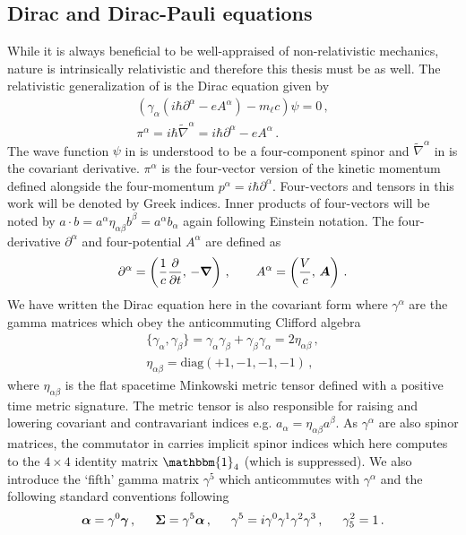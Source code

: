 \subsection{Dirac and Dirac-Pauli equations}
\label{sec:dp}
\noindent While it is always beneficial to be well-appraised of non-relativistic mechanics, nature is intrinsically relativistic and therefore this thesis must be as well. The relativistic generalization of  is the Dirac equation given by
\begin{gather}
    \label{dirac:1a}
    \left(\gamma_{\alpha}\left(i\hbar\partial^{\alpha} - eA^{\alpha}\right)-m_{\ell}c\right)\psi=0\,,\\
    \label{dirac:1b}
    \pi^{\alpha}=i\hbar{\widetilde\nabla}^{\alpha}=i\hbar\partial^{\alpha}-eA^{\alpha}\,.
\end{gather}
The wave function $\psi$ in  is understood to be a four-component spinor and $\widetilde\nabla^{\alpha}$ in  is the covariant derivative. $\pi^{\alpha}$ is the four-vector version of the kinetic momentum defined alongside the four-momentum $p^{\alpha}=i\hbar\partial^{\alpha}$. Four-vectors and tensors in this work will be denoted by Greek indices. Inner products of four-vectors will be noted by $a\cdot b=a^{\alpha}\eta_{\alpha\beta}b^{\beta}=a^{\alpha}b_{\alpha}$ again following Einstein notation. The four-derivative $\partial^{\alpha}$ and four-potential $A^{\alpha}$ are defined as
\begin{gather}
    \label{dirac:2}
    \partial^{\alpha}=\left(\frac{1}{c}\frac{\partial}{\partial t},\,-\boldsymbol{\nabla}\right)\,,\qquad A^{\alpha}=\left(\frac{V}{c},\,\boldsymbol{A}\right)\,.
\end{gather}
We have written the Dirac equation here in the covariant form where $\gamma^{\alpha}$ are the gamma matrices which obey the anticommuting Clifford algebra
\begin{gather}
    \label{gamma:1}
    \{\gamma_{\alpha},\gamma_{\beta}\}=\gamma_{\alpha}\gamma_{\beta} + \gamma_{\beta}\gamma_{\alpha} = 2\eta_{\alpha\beta}\,,\\
    \eta_{\alpha\beta}=\mathrm{diag}(+1,-1,-1,-1)\,,
\end{gather}
where $\eta_{\alpha\beta}$ is the flat spacetime Minkowski metric tensor defined with a positive time metric signature. The metric tensor is also responsible for raising and lowering covariant and contravariant indices e.g. $a_{\alpha}=\eta_{\alpha\beta}a^{\beta}$. As $\gamma^{\alpha}$ are also spinor matrices, the commutator in  carries implicit spinor indices which here computes to the $4\times4$ identity matrix $\mathbbm{1}_{4}$ (which is suppressed). We also introduce the `fifth' gamma matrix $\gamma^{5}$ which anticommutes with $\gamma^{\alpha}$ and the following standard conventions following~\cite{Itzykson:1980rh}
\begin{alignat}{1}
	\label{conventions:1} \bb{\alpha}=\gamma^{0}\bb{\gamma}\,,\indent \bb{\Sigma}=\gamma^{5}\bb{\alpha}\,,\indent \gamma^{5}=i\gamma^{0}\gamma^{1}\gamma^{2}\gamma^{3}\,,\indent \gamma^{2}_{5}=1\,.
\end{alignat}

